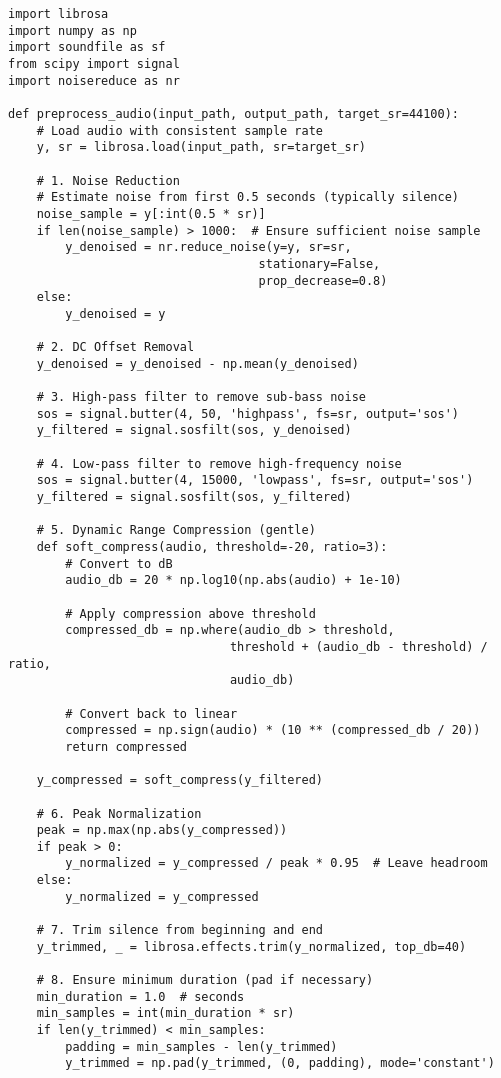 \documentclass[12pt]{article}
\begin{document}
\begin{verbatim}
import librosa
import numpy as np
import soundfile as sf
from scipy import signal
import noisereduce as nr

def preprocess_audio(input_path, output_path, target_sr=44100):
    # Load audio with consistent sample rate
    y, sr = librosa.load(input_path, sr=target_sr)
    
    # 1. Noise Reduction
    # Estimate noise from first 0.5 seconds (typically silence)
    noise_sample = y[:int(0.5 * sr)]
    if len(noise_sample) > 1000:  # Ensure sufficient noise sample
        y_denoised = nr.reduce_noise(y=y, sr=sr, 
                                   stationary=False, 
                                   prop_decrease=0.8)
    else:
        y_denoised = y
    
    # 2. DC Offset Removal
    y_denoised = y_denoised - np.mean(y_denoised)
    
    # 3. High-pass filter to remove sub-bass noise
    sos = signal.butter(4, 50, 'highpass', fs=sr, output='sos')
    y_filtered = signal.sosfilt(sos, y_denoised)
    
    # 4. Low-pass filter to remove high-frequency noise
    sos = signal.butter(4, 15000, 'lowpass', fs=sr, output='sos')
    y_filtered = signal.sosfilt(sos, y_filtered)
    
    # 5. Dynamic Range Compression (gentle)
    def soft_compress(audio, threshold=-20, ratio=3):
        # Convert to dB
        audio_db = 20 * np.log10(np.abs(audio) + 1e-10)
        
        # Apply compression above threshold
        compressed_db = np.where(audio_db > threshold,
                               threshold + (audio_db - threshold) / ratio,
                               audio_db)
        
        # Convert back to linear
        compressed = np.sign(audio) * (10 ** (compressed_db / 20))
        return compressed
    
    y_compressed = soft_compress(y_filtered)
    
    # 6. Peak Normalization
    peak = np.max(np.abs(y_compressed))
    if peak > 0:
        y_normalized = y_compressed / peak * 0.95  # Leave headroom
    else:
        y_normalized = y_compressed
    
    # 7. Trim silence from beginning and end
    y_trimmed, _ = librosa.effects.trim(y_normalized, top_db=40)
    
    # 8. Ensure minimum duration (pad if necessary)
    min_duration = 1.0  # seconds
    min_samples = int(min_duration * sr)
    if len(y_trimmed) < min_samples:
        padding = min_samples - len(y_trimmed)
        y_trimmed = np.pad(y_trimmed, (0, padding), mode='constant')
    

\end{verbatim}
\end{document}
